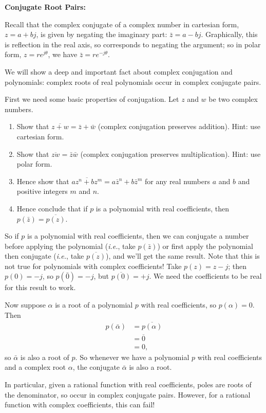 \documentclass{article}
\begin{document}
\clearpage



\textbf{Conjugate Root Pairs:}\bigskip


Recall that the complex conjugate of a complex number in cartesian form, $z=a+bj$, is given by negating the imaginary part: $\bar{z}=a-bj$. Graphically, this is reflection in the real axis, so corresponds to negating the argument; so in polar form, $z=re^{j\theta}$, we have $\bar{z}=re^{-j\theta}$.

We will show a deep and important fact about complex conjugation and polynomials: complex roots of real polynomials occur in complex conjugate pairs.

First we need some basic properties of conjugation. Let $z$ and $w$ be two complex numbers.

\begin{enumerate}
	\item Show that $\overline{z+w}=\bar{z}+\bar{w}$ (complex conjugation preserves addition). Hint: use cartesian form.
	\item Show that $\overline{zw}=\bar{z}\bar{w}$ (complex conjugation preserves multiplication). Hint: use polar form.
	\item Hence show that $\overline{az^n+bz^m}=a\bar{z}^n + b\bar{z}^m$ for any real numbers $a$ and $b$ and positive integers $m$ and $n$.
	\item Hence conclude that if $p$ is a polynomial with real coefficients, then $p(\bar{z})=\overline{p(z)}$.
\end{enumerate}


So if $p$ is a polynomial with real coefficients, then we can conjugate a number before applying the polynomial (\textit{i.e.}, take $p(\bar{z})$) or first apply the polynomial then conjugate (\textit{i.e.}, take $\overline{p(z)}$), and we'll get the same result. Note that this is not true for polynomials with complex coefficients! Take $p(z)=z-j$; then $p(0)=-j$, so $p(\bar{0})=-j$, but $\overline{p(0)}=+j$. We need the coefficients to be real for this result to work.

Now suppose $\alpha$ is a root of a polynomial $p$ with real coefficients, so $p(\alpha)=0$. Then
\begin{align*}
	p(\bar{\alpha})&=\overline{p(\alpha)}\\
	&=\overline{0}\\
	&=0,
\end{align*}
so $\bar{\alpha}$ is also a root of $p$. So whenever we have a polynomial $p$ with real coefficients and a complex root $\alpha$, the conjugate $\bar{\alpha}$ is also a root.\bigskip

In particular, given a rational function with real coefficients, poles are roots of the denominator, so occur in complex conjugate pairs. However, for a rational function with complex coefficients, this can fail!
\end{document}
